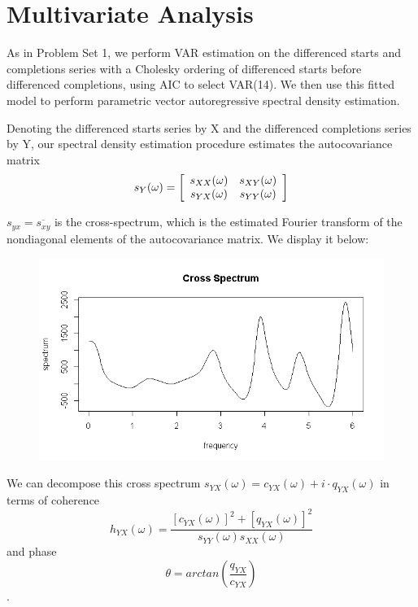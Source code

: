 \documentclass[12pt]{article} %
\begin{document}
\section{Multivariate Analysis}

As in Problem Set 1, we perform VAR estimation on the differenced starts and completions series with a Cholesky ordering of differenced starts before differenced completions, using AIC to select VAR(14). We then use this fitted model to perform parametric vector autoregressive spectral density estimation.

Denoting the differenced starts series by X and the differenced completions series by Y, our spectral density estimation procedure estimates the autocovariance matrix
$$
s_Y(\omega)=\left[
            \begin{array}{ c c } 
             s_{XX}(\omega) & s_{XY}(\omega) \\
             s_{YX}(\omega) & s_{YY}(\omega)
            \end{array} \right]
$$

$s_{yx}=\overline{s_{xy}}$ is the cross-spectrum, which is the estimated Fourier transform of the nondiagonal elements of the autocovariance matrix. We display it below:

\begin{figure}[H]
\begin{center}
\includegraphics[scale=0.55]{cross_spectrum}
\caption{}
\end{center}
\end{figure}

We can decompose this cross spectrum $s_{YX}(\omega)=c_{YX}(\omega)+i\cdot q_{YX}(\omega)$ in terms of coherence 
$$h_{YX}(\omega)=\frac{[c_{YX}(\omega)]^2+[q_{YX}(\omega)]^2}{s_{YY}(\omega)s_{XX}(\omega)}$$ 
and phase 
$$\theta=arctan(\frac{q_{YX}}{c_{YX}})$$.
\end{document}
